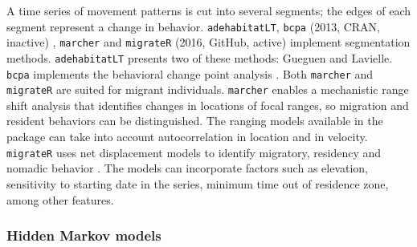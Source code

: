 \documentclass[a4paper,12pt]{article}
\newcommand{\Rpkg}[1]{\texttt{#1}}
\begin{document}
	A time series of movement patterns is cut into several segments; the edges of each segment represent a change in behavior. \Rpkg{adehabitatLT}, \Rpkg{bcpa} (2013, CRAN, inactive) \citep{Rbcpa}, \Rpkg{marcher} and \Rpkg{migrateR} (2016, GitHub, active) \citep{RmigrateR} implement segmentation methods. \Rpkg{adehabitatLT} presents two of these methods: Gueguen and Lavielle. \Rpkg{bcpa} implements the behavioral change point analysis \citep{Gurarie2009}. Both \Rpkg{marcher} and \Rpkg{migrateR} are suited for migrant individuals. \Rpkg{marcher} enables a mechanistic range shift analysis \citep{Gurarie2017} that identifies changes in locations of focal ranges, so migration and resident behaviors can be distinguished. The ranging models available in the package can take into account autocorrelation in location and in velocity. \Rpkg{migrateR} uses net displacement models to identify migratory, residency and nomadic behavior \citep{Spitz2017}. The models can incorporate factors such as elevation, sensitivity to starting date in the series, minimum time out of residence zone, among other features.  
	
	\subsubsection*{Hidden Markov models}
	
\end{document}
